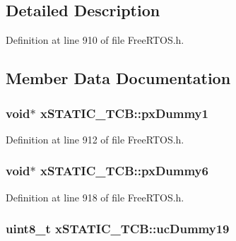 \subsection{Detailed Description}


Definition at line 910 of file Free\+R\+T\+O\+S.\+h.



\subsection{Member Data Documentation}
\subsubsection[{\texorpdfstring{px\+Dummy1}{pxDummy1}}]{\setlength{\rightskip}{0pt plus 5cm}void$\ast$ x\+S\+T\+A\+T\+I\+C\+\_\+\+T\+C\+B\+::px\+Dummy1}\hypertarget{structx_s_t_a_t_i_c___t_c_b_a2f66b620fdeb13f8969f27e1bbb4d1d1}{}\label{structx_s_t_a_t_i_c___t_c_b_a2f66b620fdeb13f8969f27e1bbb4d1d1}


Definition at line 912 of file Free\+R\+T\+O\+S.\+h.

\subsubsection[{\texorpdfstring{px\+Dummy6}{pxDummy6}}]{\setlength{\rightskip}{0pt plus 5cm}void$\ast$ x\+S\+T\+A\+T\+I\+C\+\_\+\+T\+C\+B\+::px\+Dummy6}\hypertarget{structx_s_t_a_t_i_c___t_c_b_a416495e152e5caef64994f72329c60b0}{}\label{structx_s_t_a_t_i_c___t_c_b_a416495e152e5caef64994f72329c60b0}


Definition at line 918 of file Free\+R\+T\+O\+S.\+h.

\subsubsection[{\texorpdfstring{uc\+Dummy19}{ucDummy19}}]{\setlength{\rightskip}{0pt plus 5cm}uint8\+\_\+t x\+S\+T\+A\+T\+I\+C\+\_\+\+T\+C\+B\+::uc\+Dummy19}\hypertarget{structx_s_t_a_t_i_c___t_c_b_aa98151056a161f180013ae36dae0d17b}{}\label{structx_s_t_a_t_i_c___t_c_b_aa98151056a161f180013ae36dae0d17b}


